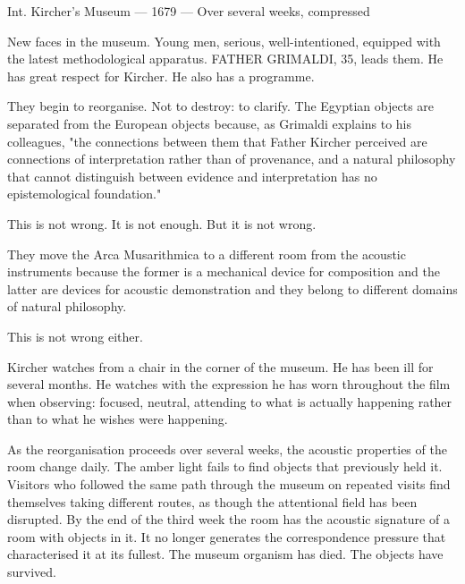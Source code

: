 \documentclass[12pt, a4paper, twoside]{memoir}
\theoremstyle{definition}
\theoremstyle{remark}
\newenvironment{sceneheading}{%
  \vspace{8pt}%
  \noindent\begin{mdframed}[
    linecolor=arkgold,
    linewidth=0.8pt,
    leftmargin=0pt,
    rightmargin=0pt,
    innerleftmargin=6pt,
    innerrightmargin=6pt,
    innertopmargin=4pt,
    innerbottommargin=4pt,
    backgroundcolor=arkgold!6
  ]%
  \noindent\textsc\bgroup\small
}{%
  \egroup\end{mdframed}\vspace{4pt}%
}
\newenvironment{action}{%
  \vspace{4pt}%
  \noindent\begin{minipage}{\linewidth}%
  \setlength{\parindent}{0pt}%
  \itshape\color{kircherink}%
}{%
  \end{minipage}\vspace{6pt}%
}
\newenvironment{museumnote}{%
  \vspace{4pt}%
  \noindent\begin{mdframed}[
    linecolor=arkgold!60,
    linewidth=0.4pt,
    leftline=true, rightline=false, topline=false, bottomline=false,
    innerleftmargin=8pt,
    innerrightmargin=0pt,
    innertopmargin=2pt,
    innerbottommargin=2pt,
    backgroundcolor=arkgold!4
  ]%
  \footnotesize\color{plaguegrey}%
}{%
  \end{mdframed}\vspace{4pt}%
}
\begin{document}
\begin{sceneheading}
Int. Kircher's Museum --- 1679 --- Over several weeks, compressed
\end{sceneheading}

\begin{action}
New faces in the museum. Young men, serious, well-intentioned, equipped with the latest methodological apparatus. FATHER GRIMALDI, 35, leads them. He has great respect for Kircher. He also has a programme.

They begin to reorganise. Not to destroy: to clarify. The Egyptian objects are separated from the European objects because, as Grimaldi explains to his colleagues, "the connections between them that Father Kircher perceived are connections of interpretation rather than of provenance, and a natural philosophy that cannot distinguish between evidence and interpretation has no epistemological foundation."

This is not wrong. It is not enough. But it is not wrong.

They move the Arca Musarithmica to a different room from the acoustic instruments because the former is a mechanical device for composition and the latter are devices for acoustic demonstration and they belong to different domains of natural philosophy.

This is not wrong either.

Kircher watches from a chair in the corner of the museum. He has been ill for several months. He watches with the expression he has worn throughout the film when observing: focused, neutral, attending to what is actually happening rather than to what he wishes were happening.
\end{action}

\begin{museumnote}
As the reorganisation proceeds over several weeks, the acoustic properties of the room change daily. The amber light fails to find objects that previously held it. Visitors who followed the same path through the museum on repeated visits find themselves taking different routes, as though the attentional field has been disrupted. By the end of the third week the room has the acoustic signature of a room with objects in it. It no longer generates the correspondence pressure that characterised it at its fullest. The museum organism has died. The objects have survived.
\end{museumnote}
\end{document}
